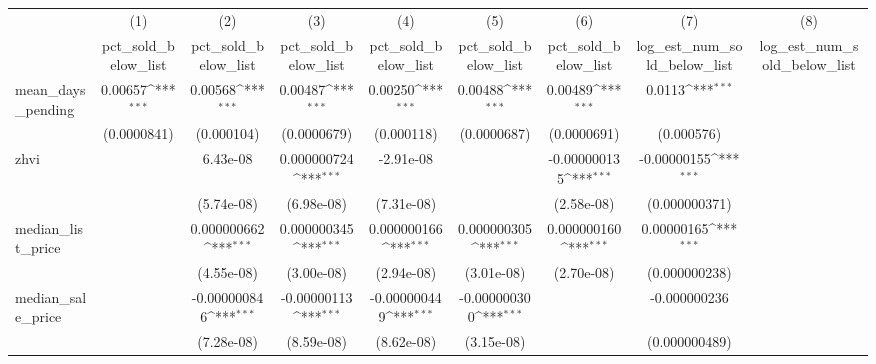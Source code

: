 {
\def\sym#1{\ifmmode^{#1}\else\(^{#1}\)\fi}
\begin{tabular}{l*{8}{c}}
\hline\hline
            &\multicolumn{1}{c}{(1)}&\multicolumn{1}{c}{(2)}&\multicolumn{1}{c}{(3)}&\multicolumn{1}{c}{(4)}&\multicolumn{1}{c}{(5)}&\multicolumn{1}{c}{(6)}&\multicolumn{1}{c}{(7)}&\multicolumn{1}{c}{(8)}\\
            &\multicolumn{1}{c}{pct\_sold\_below\_list}&\multicolumn{1}{c}{pct\_sold\_below\_list}&\multicolumn{1}{c}{pct\_sold\_below\_list}&\multicolumn{1}{c}{pct\_sold\_below\_list}&\multicolumn{1}{c}{pct\_sold\_below\_list}&\multicolumn{1}{c}{pct\_sold\_below\_list}&\multicolumn{1}{c}{log\_est\_num\_sold\_below\_list}&\multicolumn{1}{c}{log\_est\_num\_sold\_below\_list}\\
\hline
mean\_days\_pending&     0.00657\sym{***}&     0.00568\sym{***}&     0.00487\sym{***}&     0.00250\sym{***}&     0.00488\sym{***}&     0.00489\sym{***}&      0.0113\sym{***}&                     \\
            & (0.0000841)         &  (0.000104)         & (0.0000679)         &  (0.000118)         & (0.0000687)         & (0.0000691)         &  (0.000576)         &                     \\
[1em]
zhvi        &                     &    6.43e-08         & 0.000000724\sym{***}&   -2.91e-08         &                     &-0.000000135\sym{***}& -0.00000155\sym{***}&                     \\
            &                     &  (5.74e-08)         &  (6.98e-08)         &  (7.31e-08)         &                     &  (2.58e-08)         &(0.000000371)         &                     \\
[1em]
median\_list\_price&                     & 0.000000662\sym{***}& 0.000000345\sym{***}& 0.000000166\sym{***}& 0.000000305\sym{***}& 0.000000160\sym{***}&  0.00000165\sym{***}&                     \\
            &                     &  (4.55e-08)         &  (3.00e-08)         &  (2.94e-08)         &  (3.01e-08)         &  (2.70e-08)         &(0.000000238)         &                     \\
[1em]
median\_sale\_price&                     &-0.000000846\sym{***}& -0.00000113\sym{***}&-0.000000449\sym{***}&-0.000000300\sym{***}&                     &-0.000000236         &                     \\
            &                     &  (7.28e-08)         &  (8.59e-08)         &  (8.62e-08)         &  (3.15e-08)         &                     &(0.000000489)         &                     \\

\end{tabular}}
